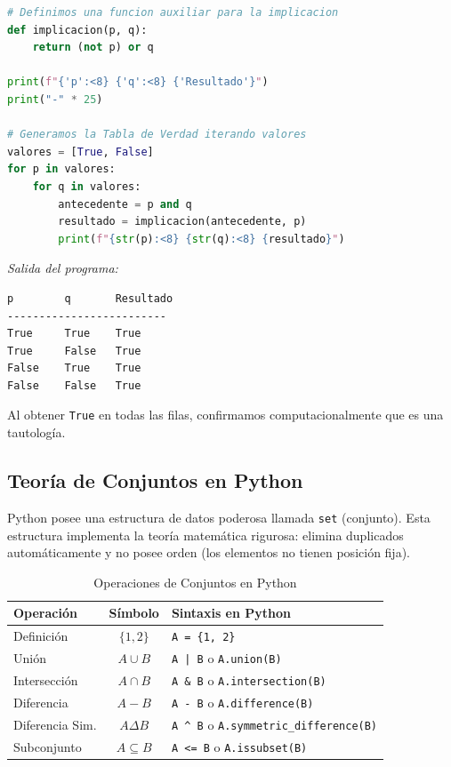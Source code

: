 \begin{lstlisting}[language=Python, caption=Script de comprobación de Tautología]
# Definimos una funcion auxiliar para la implicacion
def implicacion(p, q):
    return (not p) or q

print(f"{'p':<8} {'q':<8} {'Resultado'}")
print("-" * 25)

# Generamos la Tabla de Verdad iterando valores
valores = [True, False]
for p in valores:
    for q in valores:
        antecedente = p and q
        resultado = implicacion(antecedente, p)
        print(f"{str(p):<8} {str(q):<8} {resultado}")
\end{lstlisting}

\noindent \textit{Salida del programa:}
\begin{lstlisting}[language=bash, numbers=none, frame=none, backgroundcolor=\color{white}]
p        q       Resultado
-------------------------
True     True    True
True     False   True
False    True    True
False    False   True
\end{lstlisting}
Al obtener \texttt{True} en todas las filas, confirmamos computacionalmente que es una tautología.

\subsection{Teoría de Conjuntos en Python}

Python posee una estructura de datos poderosa llamada \texttt{set} (conjunto). Esta estructura implementa la teoría matemática rigurosa: elimina duplicados automáticamente y no posee orden (los elementos no tienen posición fija).

\begin{table}[ht]
\caption{Operaciones de Conjuntos en Python}\label{tabla:python_sets}
\centering
\begin{tabular}{|l|c|l|}
\hline
\textbf{Operación} & \textbf{Símbolo} & \textbf{Sintaxis en Python} \\ \hline
Definición & $\{1, 2\}$ & \texttt{A = \{1, 2\}} \\ \hline
Unión & $A \cup B$ & \texttt{A | B}  o  \texttt{A.union(B)} \\ \hline
Intersección & $A \cap B$ & \texttt{A \& B}  o  \texttt{A.intersection(B)} \\ \hline
Diferencia & $A - B$ & \texttt{A - B}  o  \texttt{A.difference(B)} \\ \hline
Diferencia Sim. & $A \Delta B$ & \texttt{A \^{} B}  o  \texttt{A.symmetric\_difference(B)} \\ \hline
Subconjunto & $A \subseteq B$ & \texttt{A <= B}  o  \texttt{A.issubset(B)} \\ \hline
\end{tabular}
\end{table}

